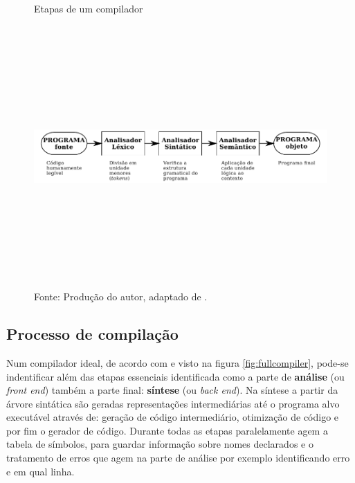 \begin{figure}[h]
  \caption{\ifdraft{\color{green}}{}Etapas de um compilador}\label{fig:compilador}
  \centering
\includegraphics[width=\textwidth,height=10cm,keepaspectratio]{figures/etapas-compilador.pdf}
  \caption*{\ifdraft{\color{green}}{}\footnotesize Fonte: Produção do autor, adaptado de .}
\end{figure}

\subsection{Processo de compilação}

Num compilador ideal, de acordo com  e visto na figura \ref{fig:fullcompiler}, pode-se indentificar além das etapas essenciais identificada como a parte de \textbf{análise} (ou \textit{front end}) também a parte final: \textbf{síntese} (ou \textit{back end}). Na síntese a partir da árvore sintática são geradas representações intermediárias até o programa alvo executável através de: geração de código intermediário, otimização de código e por fim o gerador de código. Durante todas as etapas paralelamente agem a tabela de símbolos, para guardar informação sobre nomes declarados e o tratamento de erros que agem na parte de análise por exemplo identificando erro e em qual linha.

